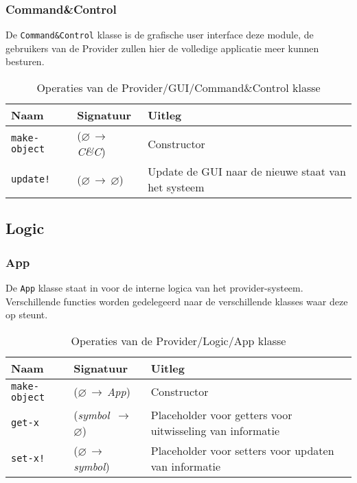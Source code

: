 \documentclass[a4paper, 11pt]{article}
\newcommand{\naar}{\,$\rightarrow$\,}
\renewcommand{\empty}{$\varnothing$}
\newcommand{\<}{\scriptsize\textless\normalsize}
\renewcommand{\>}{\scriptsize\textgreater\normalsize}
\begin{document}
\subsubsection{Command\&Control} %
De \texttt{Command\&Control} klasse is de grafische user interface deze module, de gebruikers van de Provider zullen hier de volledige applicatie meer kunnen besturen.
\begin{table}[H]
	\begin{center}
		\begin{tabular}{|l l l|}
			\hline
			\textbf{Naam} & \textbf{Signatuur} & \textbf{Uitleg}\\
			\hline
			\texttt{make-object} & (\empty \naar \textit{C\&C}) & Constructor\\\hline
			\texttt{update!} & (\empty \naar \empty) & Update de GUI naar de nieuwe staat van het systeem\\
			\hline
		\end{tabular}
		\caption{Operaties van de Provider/GUI/Command\&Control klasse}
	\end{center}
\end{table}

\newpage

\subsection{Logic} %

\subsubsection{App} %
De \texttt{App} klasse staat in voor de interne logica van het provider-systeem. Verschillende functies worden gedelegeerd naar de verschillende klasses waar deze op steunt.
\begin{table}[H]
	\begin{center}
		\begin{tabular}{|l l l|}
			\hline
			\textbf{Naam} & \textbf{Signatuur} & \textbf{Uitleg}\\
			\hline
			\texttt{make-object} & (\empty \naar \textit{App}) & Constructor\\
			\hline
			\texttt{get-x} & (\textit{symbol} \naar \empty) & Placeholder voor getters voor uitwisseling van informatie\\
			\texttt{set-x!} & (\empty \naar \textit{symbol}) & Placeholder voor setters voor updaten van informatie\\
			\hline
		\end{tabular}
		\caption{Operaties van de Provider/Logic/App klasse}
	\end{center}
\end{table}
\end{document}

